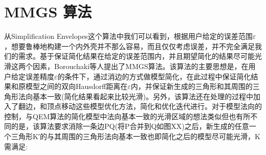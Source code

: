 \section{MMGS 算法}
从Simplification Envelopes这个算法中我们可以看到，根据用户给定的误差范围$\varepsilon$，想要鲁棒地构建一个内外壳并不那么容易，而且仅仅考虑误差，并不完全满足我们的需求。基于保证简化结果在给定的误差范围内，并且期望简化的结果尽可能光滑这两个因素，Borouchaki等人提出了MMGS算法\cite{mmgs}。该算法的主要思想是，在用户给定误差精度$\varepsilon$的条件下，通过消边的方式做模型简化，在此过程中保证简化结果和原模型之间的双向Hausdorff距离在$\varepsilon$内，并保证新生成的三角形和其周围的三角形法向基本一致(简化结果看起来比较光滑)。另外，该算法还在处理的过程中加入了翻边，和顶点移动这些模型优化方法，简化和优化迭代进行。对于模型法向的控制，与QEM算法的简化模型中法向基本一致的光滑区域的想法类似但也有所不同的是，该算法要求消除一条边PQ(将P合并到Q如图XX)之后，新生成的任意一个三角形K′的与其周围的三角形法向基本一致也即简化之后的模型尽可能光滑，K需满足:
